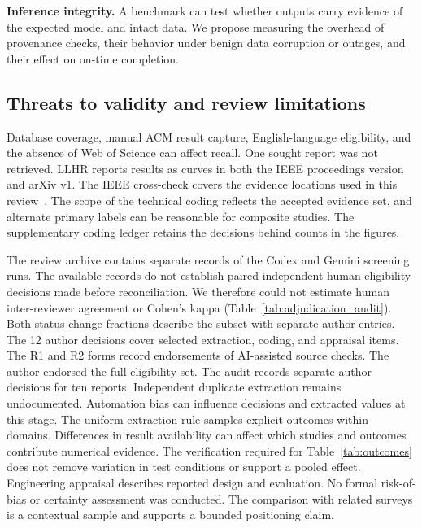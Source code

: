 \documentclass[pdflatex,sn-vancouver-num]{sn-jnl}
\begin{document}
\textbf{Inference integrity.}
A benchmark can test whether outputs carry evidence of the expected model and intact data. We propose measuring the overhead of provenance checks, their behavior under benign data corruption or outages, and their effect on on-time completion.

\subsection{Threats to validity and review limitations}
Database coverage, manual ACM result capture, English-language eligibility, and the absence of Web of Science can affect recall. One sought report was not retrieved. LLHR reports results as curves in both the IEEE proceedings version and arXiv v1. The IEEE cross-check covers the evidence locations used in this review~\cite{R0082}. The scope of the technical coding reflects the accepted evidence set, and alternate primary labels can be reasonable for composite studies. The supplementary coding ledger retains the decisions behind counts in the figures.

The review archive contains separate records of the Codex and Gemini screening runs. The available records do not establish paired independent human eligibility decisions made before reconciliation. We therefore could not estimate human inter-reviewer agreement or Cohen's kappa (Table~\ref{tab:adjudication_audit}). Both status-change fractions describe the subset with separate author entries. The 12 author decisions cover selected extraction, coding, and appraisal items. The R1 and R2 forms record endorsements of AI-assisted source checks. The author endorsed the full eligibility set. The audit records separate author decisions for ten reports. Independent duplicate extraction remains undocumented. Automation bias can influence decisions and extracted values at this stage. The uniform extraction rule samples explicit outcomes within domains. Differences in result availability can affect which studies and outcomes contribute numerical evidence. The verification required for Table~\ref{tab:outcomes} does not remove variation in test conditions or support a pooled effect. Engineering appraisal describes reported design and evaluation. No formal risk-of-bias or certainty assessment was conducted. The comparison with related surveys is a contextual sample and supports a bounded positioning claim.

\end{document}
